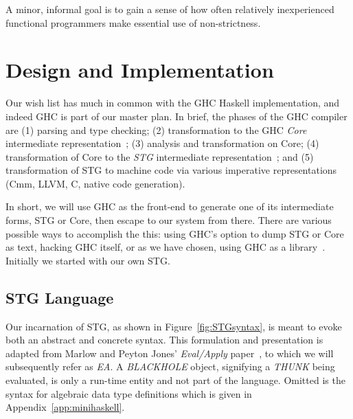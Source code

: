 \documentclass{llncs}
\renewcommand{\floatpagefraction}{0.99}
\begin{document}
A minor, informal goal is to gain a sense of how often relatively
inexperienced functional programmers make essential use of non-strictness.

\section{Design and Implementation}
Our wish list has much in common with the GHC Haskell implementation, and
indeed GHC is part of our master plan.  In brief, the phases of the GHC
compiler are (1) parsing and type checking; (2) transformation to the GHC
\emph{Core} intermediate representation~\cite{Sulzmann:2007,ghc-core}; (3)
analysis and transformation on Core; (4) transformation of Core to the
\emph{STG} intermediate representation~\cite{PJ-stockhardware}; and (5)
transformation of STG to machine code via various imperative
representations (Cmm, LLVM, C, native code generation).

In short, we will use GHC as the front-end to generate one of its
intermediate forms, STG or Core, then escape to our system from there.  There
are various possible ways to accomplish the this: using GHC's option to dump
STG or Core as text, hacking GHC itself, or as we have chosen, using GHC as a
library~\cite{ghc-as-library}.  Initially we started with our own STG.

\subsection{STG Language}
\renewcommand{\floatpagefraction}{0.99}

Our incarnation of STG, as shown in Figure~\ref{fig:STGsyntax}, is meant to
evoke both an abstract and concrete syntax.  This formulation and presentation
is adapted from Marlow and Peyton Jones' \emph{Eval/Apply}
paper~\cite{Marlow:2004}, to which we will subsequently refer as \emph{EA}\@.
A \emph{BLACKHOLE} object, signifying a \emph{THUNK} being evaluated, is only
a run-time entity and not part of the language.  Omitted is the syntax for
algebraic data type definitions which is given in
Appendix~\ref{app:minihaskell}.
\end{document}
